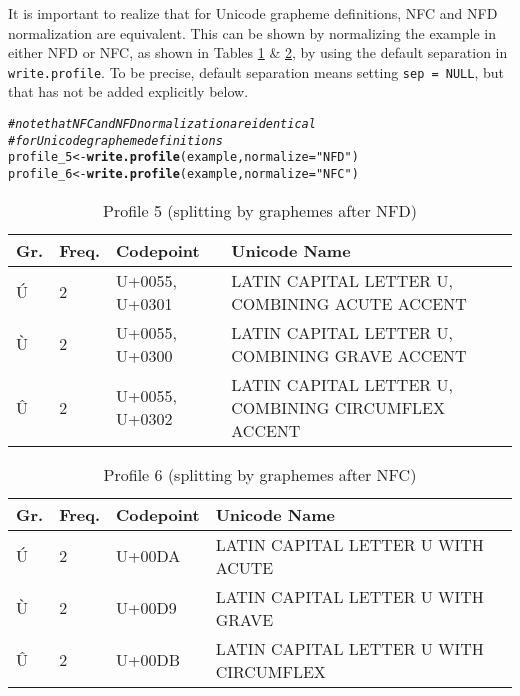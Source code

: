 \documentclass[output=inprep,
		biblatex
		]{LSP/langsci}\usepackage[]{graphicx}\usepackage[]{color}
\makeatletter
\newcommand{\hlstr}[1]{\textcolor[rgb]{0.192,0.494,0.8}{#1}}%
\newcommand{\hlcom}[1]{\textcolor[rgb]{0.678,0.584,0.686}{\textit{#1}}}%
\newcommand{\hlstd}[1]{\textcolor[rgb]{0.345,0.345,0.345}{#1}}%
\newcommand{\hlkwb}[1]{\textcolor[rgb]{0.69,0.353,0.396}{#1}}%
\newcommand{\hlkwc}[1]{\textcolor[rgb]{0.333,0.667,0.333}{#1}}%
\newcommand{\hlkwd}[1]{\textcolor[rgb]{0.737,0.353,0.396}{\textbf{#1}}}%
\newenvironment{kframe}{%
 \def\at@end@of@kframe{}%
 \ifinner\ifhmode%
  \def\at@end@of@kframe{\end{minipage}}%
  \begin{minipage}{\columnwidth}%
 \fi\fi%
 \def\FrameCommand##1{\hskip\@totalleftmargin \hskip-\fboxsep
 \colorbox{shadecolor}{##1}\hskip-\fboxsep
     \hskip-\linewidth \hskip-\@totalleftmargin \hskip\columnwidth}%
 \MakeFramed {\advance\hsize-\width
   \@totalleftmargin\z@ \linewidth\hsize
   \@setminipage}}%
 {\par\unskip\endMakeFramed%
 \at@end@of@kframe}
\newenvironment{knitrout}{}{} %
\makeatother
\begin{document}
It is important to realize that for Unicode grapheme definitions, NFC
and NFD normalization are equivalent. This can be shown by normalizing the
example in either NFD or NFC, as shown in Tables \ref{tab:profile5} \& \ref{tab:profile6}, 
by using the default separation in
\texttt{write.profile}. To be precise, default separation means setting
\texttt{sep~=~NULL}, but that has not be added explicitly below.

\begin{knitrout}\footnotesize
{}\color{fgcolor}\begin{kframe}
\begin{alltt}
\hlcom{# note that NFC and NFD normalization are identical}
\hlcom{# for Unicode grapheme definitions}
\hlstd{profile_5} \hlkwb{<-} \hlkwd{write.profile}\hlstd{(example,} \hlkwc{normalize} \hlstd{=} \hlstr{"NFD"}\hlstd{)}
\hlstd{profile_6} \hlkwb{<-} \hlkwd{write.profile}\hlstd{(example,} \hlkwc{normalize} \hlstd{=} \hlstr{"NFC"}\hlstd{)}
\end{alltt}
\end{kframe}
\end{knitrout}

\begin{table}[H]
\centering
\begingroup\scriptsize
\begin{tabular}{llll}
  \toprule
Gr. & Freq. & Codepoint & Unicode Name \\ 
  \midrule
Ú & 2 & U+0055, U+0301 & LATIN CAPITAL LETTER U, COMBINING ACUTE ACCENT \\ 
  Ù & 2 & U+0055, U+0300 & LATIN CAPITAL LETTER U, COMBINING GRAVE ACCENT \\ 
  Û & 2 & U+0055, U+0302 & LATIN CAPITAL LETTER U, COMBINING CIRCUMFLEX ACCENT \\ 
   \bottomrule
\end{tabular}
\endgroup
\caption{Profile 5 (splitting by graphemes after NFD)} 
\label{tab:profile5}
\end{table}


\begin{table}[H]
\centering
\begingroup\scriptsize
\begin{tabular}{llll}
  \toprule
Gr. & Freq. & Codepoint & Unicode Name \\ 
  \midrule
Ú & 2 & U+00DA & LATIN CAPITAL LETTER U WITH ACUTE \\ 
  Ù & 2 & U+00D9 & LATIN CAPITAL LETTER U WITH GRAVE \\ 
  Û & 2 & U+00DB & LATIN CAPITAL LETTER U WITH CIRCUMFLEX \\ 
   \bottomrule
\end{tabular}
\endgroup
\caption{Profile 6 (splitting by graphemes after NFC)} 
\label{tab:profile6}
\end{table}
\end{document}
